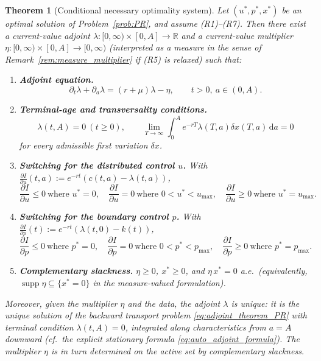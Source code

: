 \documentclass[10pt,a4paper]{amsart}
\newtheorem{theorem}{Theorem}
\newcommand{\R}{\mathbb{R}}
\newcommand{\dd}{\,\mathrm{d}}
\begin{document}
\begin{theorem}[Conditional necessary optimality system]
\label{thm:necessary_PR}
Let $(u^\ast,p^\ast,x^\ast)$ be an optimal solution of
Problem~\ref{prob:PR}, and assume \textup{(R1)--(R7)}. Then there exist a
current-value adjoint $\lambda:[0,\infty)\times[0,A]\to\R$ and a current-value
multiplier $\eta:[0,\infty)\times[0,A]\to[0,\infty)$ (interpreted as a
measure in the sense of Remark~\ref{rem:measure_multiplier} if (R5) is
relaxed) such that:
\begin{enumerate}[leftmargin=2.6em]
    \item[\textup{(i)}] \textbf{Adjoint equation.}
    \begin{equation}\label{eq:adjoint_theorem_PR}
    \partial_t\lambda+\partial_a\lambda=(r+\mu)\lambda-\eta,
    \qquad t>0,\ a\in(0,A).
    \end{equation}
    \item[\textup{(ii)}] \textbf{Terminal-age and transversality conditions.}
    \begin{equation}\label{eq:adjoint_terminal_theorem_PR}
    \lambda(t,A)=0\ (t\ge0),\qquad
    \lim_{T\to\infty}\int_0^A e^{-rT}\lambda(T,a)\delta x(T,a)\dd a=0
    \end{equation}
    for every admissible first variation $\delta x$.
    \item[\textup{(iii)}] \textbf{Switching for the distributed control $u$.}
    With $\frac{\partial I}{\partial u}(t,a):=e^{-rt}(c(t,a)-\lambda(t,a))$,
    \begin{equation}\label{eq:u_switch}
    \frac{\partial I}{\partial u}\le0\ \text{where }u^\ast=0,\quad
    \frac{\partial I}{\partial u}=0\ \text{where }0<u^\ast<u_{\max},\quad
    \frac{\partial I}{\partial u}\ge0\ \text{where }u^\ast=u_{\max}.
    \end{equation}
    \item[\textup{(iv)}] \textbf{Switching for the boundary control $p$.}
    With $\frac{\partial I}{\partial p}(t):=e^{-rt}(\lambda(t,0)-k(t))$,
    \begin{equation}\label{eq:p_switch}
    \frac{\partial I}{\partial p}\le0\ \text{where }p^\ast=0,\quad
    \frac{\partial I}{\partial p}=0\ \text{where }0<p^\ast<p_{\max},\quad
    \frac{\partial I}{\partial p}\ge0\ \text{where }p^\ast=p_{\max}.
    \end{equation}
    \item[\textup{(v)}] \textbf{Complementary slackness.}
    $\eta\ge0$, $x^\ast\ge0$, and $\eta\,x^\ast=0$ a.e.\ (equivalently,
    $\operatorname{supp}\eta\subseteq\{x^\ast=0\}$ in the measure-valued
    formulation).
\end{enumerate}
Moreover, given the multiplier $\eta$ and the data, the adjoint $\lambda$ is
\emph{unique}: it is the unique solution of the backward transport problem
\eqref{eq:adjoint_theorem_PR} with terminal condition
$\lambda(t,A)=0$, integrated along characteristics from $a=A$ downward
(cf.\ the explicit stationary formula \eqref{eq:auto_adjoint_formula}). The
multiplier $\eta$ is in turn determined on the active set by complementary
slackness.
\end{theorem}
\end{document}
